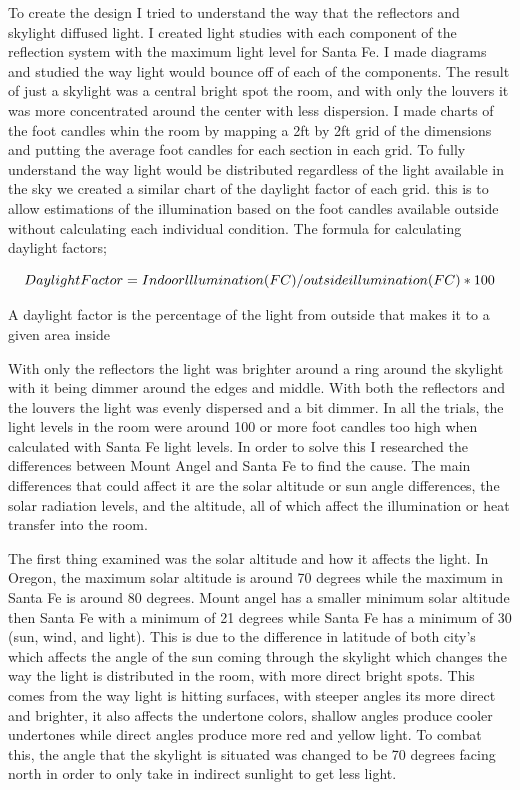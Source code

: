 \documentclass{article}
\begin{document}
To create the design I tried to understand the way that the reflectors and skylight diffused light. I created light studies with each component of the reflection system with the maximum light level for Santa Fe. I made diagrams and studied the way light would bounce off of each of the components. The result of just a skylight was a central bright spot the room, and with only the louvers it was more concentrated around the center with less dispersion. I made charts of the foot candles whin the room by mapping a 2ft by 2ft grid of the dimensions and putting the average foot candles for each section in each grid. To fully understand the way light would be distributed regardless of the light available in the sky we created a similar chart of the daylight factor of each grid. this is to allow estimations of the illumination based on the foot candles available outside without calculating each individual condition. The formula for calculating daylight factors;

\begin{equation}
    $$ Daylight Factor = Indoor lllumination(FC) / outside illumination(FC) * 100 $$
\end{equation}

A daylight factor is the percentage of the light from outside that makes it to a given area inside 

With only the reflectors the light was brighter around a ring around the skylight with it being dimmer around the edges and middle. With both the reflectors and the louvers the light was evenly dispersed and a bit dimmer. In all the trials, the light levels in the room were around 100 or more foot candles too high when calculated with Santa Fe light levels. In order to solve this I researched the differences between Mount Angel and Santa Fe to find the cause. The main differences that could affect it are the solar altitude or sun angle differences,  the solar radiation levels, and the altitude, all of which affect the illumination or heat transfer into the room. 


The first thing examined was the solar altitude and how it affects the light. In Oregon, the maximum solar altitude is around 70 degrees while the maximum in Santa Fe is around 80 degrees. Mount angel has a smaller minimum solar altitude then Santa Fe with a minimum of 21 degrees while Santa Fe has a minimum of 30 (sun, wind, and light). This is due to the difference in latitude of both city's which affects the angle of the sun coming through the skylight which changes the way the light is distributed in the room, with more direct bright spots. This comes from the way light is hitting surfaces, with steeper angles its more direct and brighter, it also affects the undertone colors, shallow angles produce cooler undertones while direct angles produce more red and yellow light.  To combat this, the angle that the skylight is situated was changed to be 70 degrees facing north in order to only take in indirect sunlight to get less light. 
\end{document}

